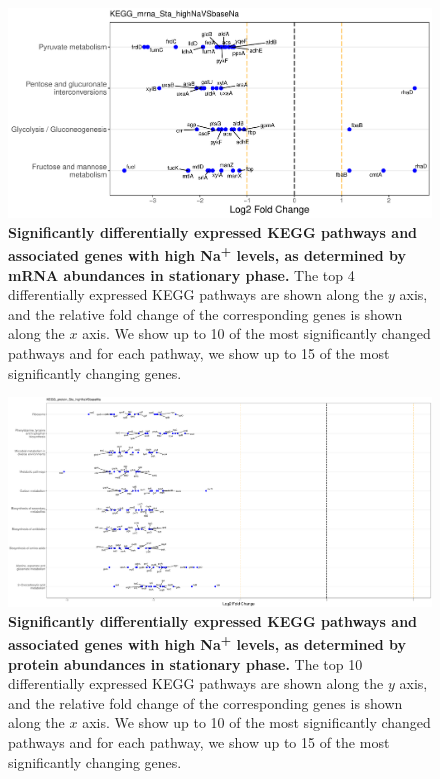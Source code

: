 \documentclass[a4paper]{article}
\begin{document}
\clearpage
\begin{figure}
	\includegraphics[width=1.0\textwidth]{../../d_figures/KEGG15_mrna_Sta_highNaVSbaseNa_withTitle.pdf}
	\caption[Significantly differentially expressed KEGG pathways for mRNA samples in stationary phase tested for high Na\textsuperscript{+} against base Na\textsuperscript{+}]
	{\textbf{Significantly differentially expressed KEGG pathways and associated genes with high Na\textsuperscript{+} levels, as determined by mRNA abundances in stationary phase.} The top 4 differentially expressed KEGG pathways are shown along the $y$ axis, and the relative fold change of the corresponding genes is shown along the $x$ axis. We show up to 10 of the most significantly changed pathways and for each pathway, we show up to 15 of the most significantly changing genes.}
\end{figure}

\clearpage
\begin{figure}
	\includegraphics[width=1.0\textwidth]{../../d_figures/KEGG16_protein_Sta_highNaVSbaseNa_withTitle}
	\caption[Significantly differentially expressed KEGG pathways for protein samples in stationary phase tested for high Na\textsuperscript{+} against base Na\textsuperscript{+}]
	{\textbf{Significantly differentially expressed KEGG pathways and associated genes with high Na\textsuperscript{+} levels, as determined by protein abundances in stationary phase.} The top 10 differentially expressed KEGG pathways are shown along the $y$ axis, and the relative fold change of the corresponding genes is shown along the $x$ axis. We show up to 10 of the most significantly changed pathways and for each pathway, we show up to 15 of the most significantly changing genes.}
\end{figure}
\clearpage
\end{document}

